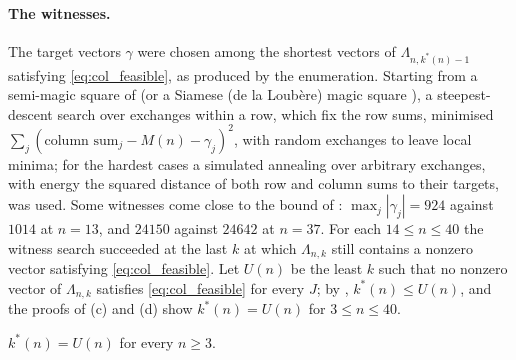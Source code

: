 \paragraph{The witnesses.}
The target vectors $\gamma$ were chosen among the shortest vectors of $\Lambda_{n,k^*(n)-1}$ satisfying \eqref{eq:col_feasible}, as produced by the enumeration.
Starting from a semi-magic square of  (or a Siamese (de la Loub\`ere) magic square \cite{andrews1960magic}), a steepest-descent search over exchanges within a row, which fix the row sums, minimised $\sum_j(\text{column sum}_j-M(n)-\gamma_j)^2$, with random exchanges to leave local minima; for the hardest cases a simulated annealing over arbitrary exchanges, with energy the squared distance of both row and column sums to their targets, was used.
Some witnesses come close to the bound of : $\max_j|\gamma_j|=924$ against $1014$ at $n=13$, and $24150$ against $24642$ at $n=37$.
For each $14\le n\le40$ the witness search succeeded at the last $k$ at which $\Lambda_{n,k}$ still contains a nonzero vector satisfying \eqref{eq:col_feasible}.
Let $U(n)$ be the least $k$ such that no nonzero vector of $\Lambda_{n,k}$ satisfies \eqref{eq:col_feasible} for every $J$; by , $k^*(n)\le U(n)$, and the proofs of (c) and (d) show $k^*(n)=U(n)$ for $3\le n\le40$.

\begin{conjecture}
\label{conj:lattice}
$k^*(n)=U(n)$ for every $n\ge3$.
\end{conjecture}

